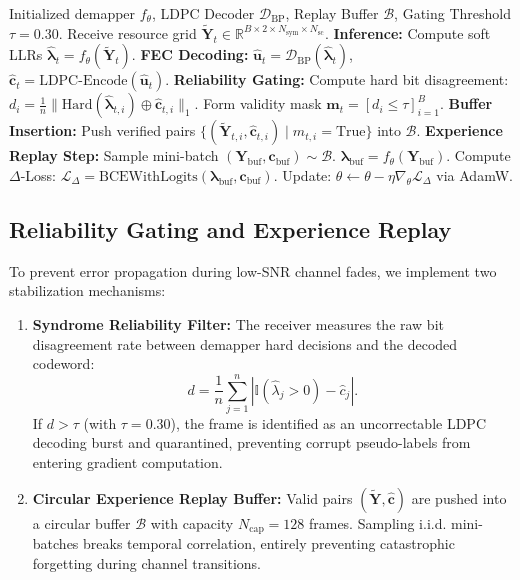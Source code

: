 \documentclass[journal]{IEEEtran}
\begin{document}
\begin{algorithm}[!t]
\caption{Self-Supervised Decision-Directed Adaptation ($\Delta$-Loop)}
\label{alg:delta_loop}
\begin{algorithmic}[1]
\REQUIRE Initialized demapper $f_\theta$, LDPC Decoder $\mathcal{D}_{\text{BP}}$, Replay Buffer $\mathcal{B}$, Gating Threshold $\tau = 0.30$.
    \STATE Receive resource grid $\tilde{\mathbf{Y}}_t \in \mathbb{R}^{B \times 2 \times N_{\text{sym}} \times N_{\text{sc}}}$.
    \STATE \textbf{Inference:} Compute soft LLRs $\hat{\boldsymbol{\lambda}}_t = f_\theta(\tilde{\mathbf{Y}}_t)$.
    \STATE \textbf{FEC Decoding:} $\hat{\mathbf{u}}_t = \mathcal{D}_{\text{BP}}(\hat{\boldsymbol{\lambda}}_t)$, $\hat{\mathbf{c}}_t = \text{LDPC-Encode}(\hat{\mathbf{u}}_t)$.
    \STATE \textbf{Reliability Gating:}
    \STATE Compute hard bit disagreement: $d_i = \frac{1}{n} \|\text{Hard}(\hat{\boldsymbol{\lambda}}_{t,i}) \oplus \hat{\mathbf{c}}_{t,i}\|_1$.
    \STATE Form validity mask $\mathbf{m}_t = [d_i \le \tau]_{i=1}^B$.
    \STATE \textbf{Buffer Insertion:}
    \STATE Push verified pairs $\{(\tilde{\mathbf{Y}}_{t,i}, \hat{\mathbf{c}}_{t,i}) \mid m_{t,i} = \text{True}\}$ into $\mathcal{B}$.
    \STATE \textbf{Experience Replay Step:}
        \STATE Sample mini-batch $(\mathbf{Y}_{\text{buf}}, \mathbf{c}_{\text{buf}}) \sim \mathcal{B}$.
        \STATE $\boldsymbol{\lambda}_{\text{buf}} = f_\theta(\mathbf{Y}_{\text{buf}})$.
        \STATE Compute $\Delta$-Loss: $\mathcal{L}_\Delta = \text{BCEWithLogits}(\boldsymbol{\lambda}_{\text{buf}}, \mathbf{c}_{\text{buf}})$.
        \STATE Update: $\theta \leftarrow \theta - \eta \nabla_\theta \mathcal{L}_\Delta$ via AdamW.
    \ENDIF
\ENDFOR
\end{algorithmic}
\end{algorithm}

\subsection{Reliability Gating and Experience Replay}
To prevent error propagation during low-SNR channel fades, we implement two stabilization mechanisms:
\begin{enumerate}
    \item \textbf{Syndrome Reliability Filter:} The receiver measures the raw bit disagreement rate between demapper hard decisions and the decoded codeword:
    \begin{equation}
        d = \frac{1}{n} \sum_{j=1}^n \left| \mathbb{I}(\hat{\lambda}_j > 0) - \hat{c}_j \right|.
    \end{equation}
    If $d > \tau$ (with $\tau = 0.30$), the frame is identified as an uncorrectable LDPC decoding burst and quarantined, preventing corrupt pseudo-labels from entering gradient computation.
    \item \textbf{Circular Experience Replay Buffer:} Valid pairs $(\tilde{\mathbf{Y}}, \hat{\mathbf{c}})$ are pushed into a circular buffer $\mathcal{B}$ with capacity $N_{\text{cap}} = 128$ frames. Sampling i.i.d. mini-batches breaks temporal correlation, entirely preventing catastrophic forgetting during channel transitions.
\end{enumerate}
\end{document}
